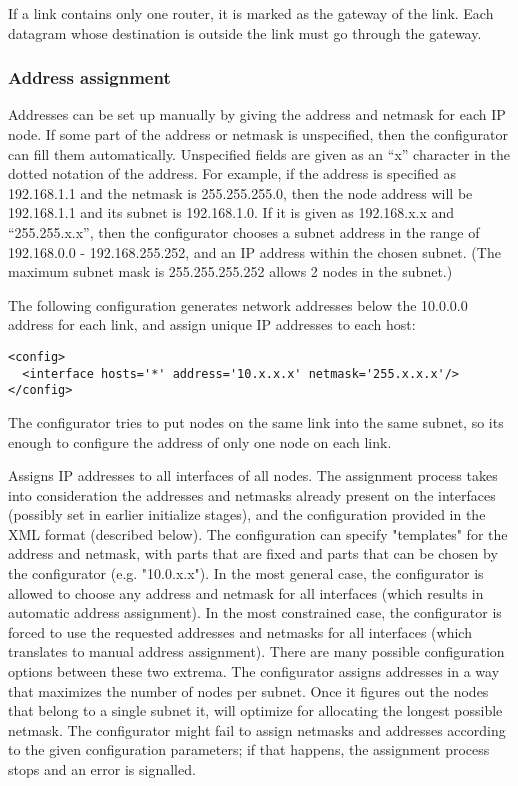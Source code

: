 If a link contains only one router, it is marked as the gateway
of the link. Each datagram whose destination is outside the link
must go through the gateway.

\subsubsection*{Address assignment}

Addresses can be set up manually by giving the address and netmask for
each IP node. If some part of the address or netmask is unspecified,
then the configurator can fill them automatically. Unspecified fields
are given as an ``x'' character in the dotted notation of the address.
For example, if the address is specified as 192.168.1.1 and the
netmask is 255.255.255.0, then the node address will be 192.168.1.1
and its subnet is 192.168.1.0. If it is given as 192.168.x.x and
``255.255.x.x'', then the configurator chooses a subnet address in the range
of 192.168.0.0 - 192.168.255.252, and an IP address within the chosen 
subnet. (The maximum subnet mask is 255.255.255.252 allows 2 nodes in the subnet.)

The following configuration generates network addresses below the 10.0.0.0
address for each link, and assign unique IP addresses to each host:

\begin{verbatim}
<config>
  <interface hosts='*' address='10.x.x.x' netmask='255.x.x.x'/>
</config>
\end{verbatim}

The configurator tries to put nodes on the same link into the same subnet,
so its enough to configure the address of only one node on each link.

Assigns IP addresses to all interfaces of all nodes. The
    assignment process takes into consideration the addresses and netmasks
    already present on the interfaces (possibly set in earlier initialize
    stages), and the configuration provided in the XML format (described
    below). The configuration can specify "templates" for the address
    and netmask, with parts that are fixed and parts that can be chosen
    by the configurator (e.g. "10.0.x.x"). In the most general case,
    the configurator is allowed to choose any address and netmask for all
    interfaces (which results in automatic address assignment). In the most
    constrained case, the configurator is forced to use the requested addresses
    and netmasks for all interfaces (which translates to manual address assignment).
    There are many possible configuration options between these two extrema. The
    configurator assigns addresses in a way that maximizes the number of
    nodes per subnet. Once it figures out the nodes that belong to a single
    subnet it, will optimize for allocating the longest possible netmask.
    The configurator might fail to assign netmasks and addresses according
    to the given configuration parameters; if that happens, the assignment
    process stops and an error is signalled.

